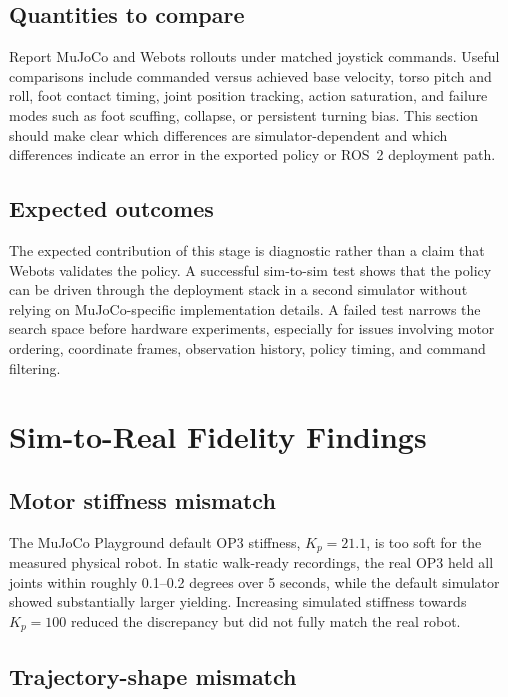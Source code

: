 \subsection{Quantities to compare}

Report MuJoCo and Webots rollouts under matched joystick commands. Useful comparisons include commanded versus achieved base velocity, torso pitch and roll, foot contact timing, joint position tracking, action saturation, and failure modes such as foot scuffing, collapse, or persistent turning bias. This section should make clear which differences are simulator-dependent and which differences indicate an error in the exported policy or ROS~2 deployment path.

\subsection{Expected outcomes}

The expected contribution of this stage is diagnostic rather than a claim that Webots validates the policy. A successful sim-to-sim test shows that the policy can be driven through the deployment stack in a second simulator without relying on MuJoCo-specific implementation details. A failed test narrows the search space before hardware experiments, especially for issues involving motor ordering, coordinate frames, observation history, policy timing, and command filtering.

\section{Sim-to-Real Fidelity Findings}
\label{sec:sim2real}

\subsection{Motor stiffness mismatch}

The MuJoCo Playground default OP3 stiffness, $K_p=21.1$, is too soft for the measured physical robot. In static walk-ready recordings, the real OP3 held all joints within roughly 0.1--0.2 degrees over 5 seconds, while the default simulator showed substantially larger yielding. Increasing simulated stiffness towards $K_p=100$ reduced the discrepancy but did not fully match the real robot.

\subsection{Trajectory-shape mismatch}


